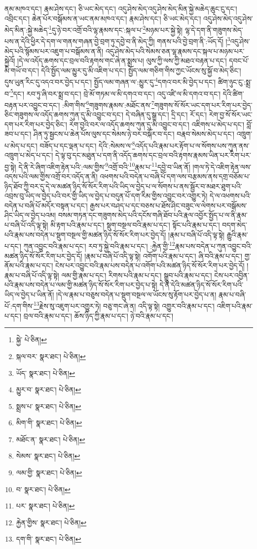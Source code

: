ནམ་མཁའ་དང་། རྣམ་ཤེས་དང་། ཅི་ཡང་མེད་དང་། འདུ་ཤེས་མེད་འདུ་ཤེས་མེད་མིན་སྐྱེ་མཆེད་ཆུང་ངུ་དང་། འབྲིང་དང་། ཆེན་པོར་བསྒོམས་ན་ཡང་ནམ་མཁའ་དང་། རྣམ་ཤེས་དང་། ཅི་ཡང་མེད་དང་། འདུ་ཤེས་མེད་འདུ་ཤེས་མེད་མིན་:སྐྱེ་མཆེད་\footnote{སྐྱེ་  པེ་ཅིན། }དུ་ཉེ་བར་འགྲོ་བའི་ལྷ་རྣམས་དང་:སྐལ་པ་\footnote{སྐལ་བར་  སྣར་ཐང་།  པེ་ཅིན། }མཉམ་པར་སྐྱེ་སྟེ། ལྷ་དེ་དག་ནི་གཟུགས་མེད་པས་ན་དེའི་ཕྱིར་དེ་དག་ལ་གནས་གཞན་བྱེ་བྲག་ཏུ་དབྱེ་བ་ནི་མེད་ཀྱི། གནས་པའི་བྱེ་བྲག་ནི་:ཡོད་དོ། །\footnote{ཡོད་  སྣར་ཐང་།  པེ་ཅིན། }འདུ་ཤེས་མེད་པའི་སྙོམས་པར་འཇུག་པ་བསྒོམས་ན་ནི། འདུ་ཤེས་མེད་པའི་སེམས་ཅན་ལྷ་རྣམས་དང་སྐལ་པ་མཉམ་པར་སྐྱེའོ། །དེ་ལ་འདོད་ཆགས་དང་བྲལ་བའི་རྟགས་གང་ཞེ་ན་སྨྲས་པ། ལུས་ཀྱི་ལས་ཀྱི་མཐའ་བརྟན་པ་དང་། དབང་པོ་མི་གཡོ་བ་དང་། དེའི་སྤྱོད་ལམ་མྱུར་དུ་མི་འཇིག་པ་དང་། སྤྱོད་ལམ་གཅིག་གིས་ཀྱང་ཡོངས་སུ་སྐྱོ་བ་མེད་ཅིང་། དུས་ཡུན་རིང་དུ་འདའ་བར་བྱེད་པ་དང་། སྤྱོད་ལམ་གཞན་ལ་:མྱུར་དུ་\footnote{མྱུར་བ་  སྣར་ཐང་།  པེ་ཅིན། }དགའ་བར་མི་བྱེད་པ་དང་། ཚིག་ཉུང་ངུ་:སྨྲ་བ་\footnote{སྨྲས་པ་  སྣར་ཐང་།  པེ་ཅིན། }དང་། རབ་ཏུ་ཞི་བར་སྨྲ་བ་དང་། བྲེ་མོ་གཏམ་ལ་མི་དགའ་བ་དང་། འདུ་འཛི་ལ་མི་དགའ་བ་དང་། དེའི་ཚིག་བརྟན་པར་འབྱུང་བ་དང་། :མིག་གིས་\footnote{མིག་གི་  སྣར་ཐང་།  པེ་ཅིན། }གཟུགས་རྣམས་:མཐོང་ནས་\footnote{མཐོང་ན་  སྣར་ཐང་།  པེ་ཅིན། }གཟུགས་སོ་སོར་ཡང་དག་པར་རིག་པར་བྱེད་ཅིང་གཟུགས་ལ་འདོད་ཆགས་ཀུན་དུ་མི་འབྱུང་བ་དང་། དེ་བཞིན་དུ་སྒྲ་དང་། དྲི་དང་། རོ་དང་། རེག་བྱ་སོ་སོར་ཡང་དག་པར་རིག་པར་བྱེད་ཅིང་། རེག་བྱའི་བར་ལ་འདོད་ཆགས་ཀུན་དུ་མི་འབྱུང་བ་དང་། འཇིགས་པ་མེད་པ་དང་། བློ་ཟབ་པ་དང་། ཤིན་ཏུ་སྦྱངས་པ་ཆེན་པོས་ལུས་དང་སེམས་ཉེ་བར་བསྐོར་བ་དང་། བརྣབ་སེམས་མེད་པ་དང་། འཁྲུག་པ་མེད་པ་དང་། བཟོད་པ་དང་ལྡན་པ་དང་། དེའི་:སེམས་ལ་\footnote{སེམས་  སྣར་ཐང་།  པེ་ཅིན། }འདོད་པའི་རྣམ་པར་རྟོག་པ་ལ་སོགས་པས་ཀུན་ནས་འཁྲུག་པ་མེད་པ་དང་། དེ་ལྟ་བུ་དང་མཐུན་པ་དག་ནི་འདོད་ཆགས་དང་བྲལ་བའི་རྟགས་རྣམས་ཡིན་པར་རིག་པར་བྱ་སྟེ། དེ་ནི་རེ་ཞིག་འཇིག་རྟེན་པའི་:ལམ་གྱིས་\footnote{ལམ་གྱི་  སྣར་ཐང་།  པེ་ཅིན། }འགྲོ་བའི་\footnote{བ་  སྣར་ཐང་།  པེ་ཅིན། }རྣམ་པ་\footnote{པར་  སྣར་ཐང་།  པེ་ཅིན། }དབྱེ་བ་ཡིན་ནོ། །གལ་ཏེ་དེ་འཇིག་རྟེན་ལས་འདས་པའི་ལམ་གྱིས་འགྲོ་བར་འདོད་ན་ནི། འཕགས་པའི་བདེན་པ་བཞི་པོ་དག་ལས་བརྩམས་ནས་དགྲ་བཅོམ་པ་ཉིད་ཐོབ་ཀྱི་བར་དུ་དེ་ལ་མཚན་ཉིད་སོ་སོར་རིག་པའི་ཡིད་ལ་བྱེད་པ་ལ་སོགས་པ་ནས་སྦྱོར་བ་མཐར་ཐུག་པའི་འབྲས་བུ་ཡིད་ལ་བྱེད་པའི་བར་གྱི་ཡིད་ལ་བྱེད་པ་བདུན་པོ་དག་རིམ་གྱིས་འབྱུང་བར་འགྱུར་ཏེ། དེ་ལ་འཕགས་པའི་བདེན་པ་བཞི་པོ་མདོར་བསྟན་པ་དང་། རྒྱས་པར་བཤད་པ་དང་བཅས་པ་ཐོས་ཤིང་བཟུང་ལ་ལེགས་པར་བསྒོམས་ཤིང་ཡིད་ལ་བྱེད་པའམ། བསམ་གཏན་དང་གཟུགས་མེད་པའི་དངོས་གཞི་ཐོབ་པའི་རྣལ་འབྱོར་སྤྱོད་པ་ལ་ནི་རྣམ་པ་བཞི་པོ་འདི་ལྟ་སྟེ། མི་རྟག་པའི་རྣམ་པ་དང་། སྡུག་བསྔལ་བའི་རྣམ་པ་དང་། སྟོང་པའི་རྣམ་པ་དང་། བདག་མེད་པའི་རྣམ་པས་བདེན་པ་སྡུག་བསྔལ་གྱི་མཚན་ཉིད་སོ་སོར་རིག་པར་བྱེད་དོ། །རྣམ་པ་བཞི་པོ་འདི་ལྟ་སྟེ། རྒྱུའི་རྣམ་པ་དང་། ཀུན་འབྱུང་བའི་རྣམ་པ་དང་། རབ་ཏུ་སྐྱེ་བའི་རྣམ་པ་དང་། :རྐྱེན་གྱི་\footnote{རྐྱེན་གྱིས་  སྣར་ཐང་།  པེ་ཅིན། }རྣམ་པས་བདེན་པ་ཀུན་འབྱུང་བའི་མཚན་ཉིད་སོ་སོར་རིག་པར་བྱེད་དོ། །རྣམ་པ་བཞི་པོ་འདི་ལྟ་སྟེ། འགོག་པའི་རྣམ་པ་དང་། ཞི་བའི་རྣམ་པ་དང་། གྱ་ནོམ་པའི་རྣམ་པ་དང་། ངེས་པར་འབྱུང་བའི་རྣམ་པས་བདེན་པ་འགོག་པའི་མཚན་ཉིད་སོ་སོར་རིག་པར་བྱེད་དོ། །རྣམ་པ་བཞི་པོ་འདི་ལྟ་སྟེ། ལམ་གྱི་རྣམ་པ་དང་། རིགས་པའི་རྣམ་པ་དང་། སྒྲུབ་པའི་རྣམ་པ་དང་། ངེས་པར་འབྱིན་པའི་རྣམ་པས་བདེན་པ་ལམ་གྱི་མཚན་ཉིད་སོ་སོར་རིག་པར་བྱེད་པ་སྟེ། དེ་ནི་དེའི་མཚན་ཉིད་སོ་སོར་རིག་པའི་ཡིད་ལ་བྱེད་པ་ཡིན་ནོ། །དེ་ལ་རྣམ་པ་བཅུས་བདེན་པ་སྡུག་བསྔལ་ལ་ཡོངས་སུ་རྟོག་པར་བྱེད་པ་ན། རྣམ་པ་བཞི་པོ་:དག་གིས་\footnote{དག་གི་  སྣར་ཐང་།  པེ་ཅིན། }རྗེས་སུ་འཇུག་པར་འགྱུར་ཏེ། བཅུ་གང་ཞེ་ན། འདི་ལྟ་སྟེ། འགྱུར་བའི་རྣམ་པ་དང་། འཇིག་པའི་རྣམ་པ་དང་། བྲལ་བའི་རྣམ་པ་དང་། ཆོས་ཉིད་ཀྱི་རྣམ་པ་དང་། ཉེ་བའི་རྣམ་པ་དང་། 